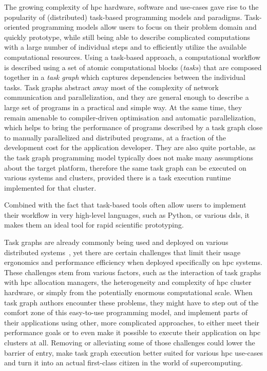 The growing complexity of \gls{hpc} hardware, software and use-cases gave rise to the
popularity of (distributed) task-based programming models and paradigms. Task-oriented programming
models allow users to focus on their problem domain and quickly prototype, while still being able
to describe complicated computations with a large number of individual steps and to efficiently
utilize the available computational resources. Using a task-based approach, a computational
workflow is described using a set of atomic computational blocks (\emph{tasks}) that are
composed together in a \emph{task graph} which captures dependencies between the individual
tasks. Task graphs abstract away most of the complexity of network communication and
parallelization, and they are general enough to describe a large set of programs in a practical and
simple way. At the same time, they remain amenable to compiler-driven optimisation and automatic
parallelization, which helps to bring the performance of programs described by a task graph close
to manually parallelized and distributed programs, at a fraction of the development cost for the
application developer. They are also quite portable, as the task graph programming model typically
does not make many assumptions about the target platform, therefore the same task graph can be
executed on various systems and clusters, provided there is a task execution runtime implemented
for that cluster.

Combined with the fact that task-based tools often allow users to implement their workflow in very
high-level languages, such as Python, or various \glspl{dsl}, it makes them an ideal
tool for rapid scientific prototyping.

Task graphs are already commonly being used and deployed on various distributed
systems~\cite{pegasus, workflows_at_scale, large_scale_modelling}, yet there are certain challenges that limit their usage ergonomics
and performance efficiency when deployed specifically on \gls{hpc} systems. These
challenges stem from various factors, such as the interaction of task graphs with
\gls{hpc} allocation managers, the heterogeneity and complexity of
\gls{hpc} cluster hardware, or simply from the potentially enormous computational
scale. When task graph authors encounter these problems, they might have to step out of the comfort
zone of this easy-to-use programming model, and implement parts of their applications using other,
more complicated approaches, to either meet their performance goals or to even make it possible to
execute their application on \gls{hpc} clusters at all. Removing or alleviating some
of those challenges could lower the barrier of entry, make task graph execution better suited for
various \gls{hpc} use-cases and turn it into an actual first-class citizen in the
world of supercomputing\@.

